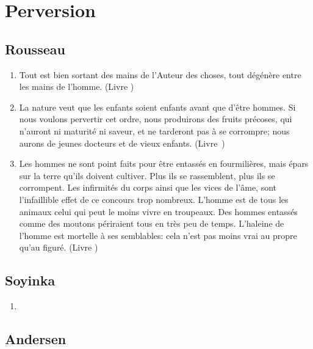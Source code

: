 \documentclass[a4paper, 11pt, hidelinks]{article}
\newcommand{\rb}[1]{\Romanbar{#1}}
\begin{document}
\section{Perversion}



\subsection{Rousseau}


\begin{enumerate}
    \item Tout est bien sortant des mains de l'Auteur des choses, tout dégénère entre les mains de l'homme. (Livre \rb{1})
    \item La nature veut que les enfants soient enfants avant que d'être hommes. Si nous voulons pervertir cet ordre, nous produirons des fruits précoses, qui n'auront ni maturité ni saveur, et ne tarderont pas à se corrompre; nous aurons de jeunes docteurs et de vieux enfants. (Livre \rb{2})
    \item Les hommes ne sont point faits pour être entassés en fourmilières, mais épars sur la terre qu'ils doivent cultiver. Plus ils se rassemblent, plus ils se corrompent. Les infirmités du corps ainsi que les vices de l'âme, sont l'infaillible effet de ce concours trop nombreux. L'homme est de tous les animaux celui qui peut le moins vivre en troupeaux. Des hommes entassés comme des moutons périraient tous en très peu de temps. L'haleine de l'homme est mortelle à ses semblables: cela n'est pas moins vrai au propre qu'au figuré. (Livre \rb{1})

\end{enumerate}



\subsection{Soyinka}


\begin{enumerate}
    \item 
\end{enumerate}




\subsection{Andersen}
\end{document}
